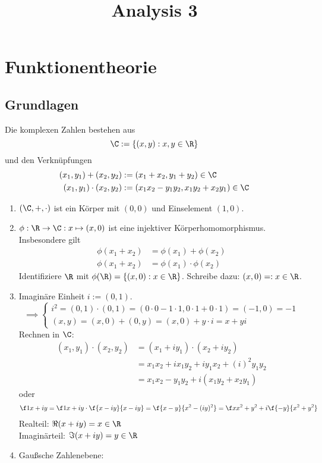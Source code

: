 \documentclass[a4paper,10pt]{scrartcl}
\title{Analysis 3}
\begin{document}
\maketitle

\tableofcontents
\newpage

\section{Funktionentheorie}

\subsection{Grundlagen}

\begin{df}
	\label{df:1.1}	
	Die komplexen Zahlen bestehen aus
	\[
		\C := \{(x,y) : x,y\in \R\}
	\]
	und den Verknüpfungen
	\begin{align*}
		(x_1,y_1) + (x_2,y_2) &:= (x_1 + x_2, y_1 + y_2) \in \C \\
		(x_1,y_1) \cdot (x_2,y_2) &:= (x_1x_2 - y_1y_2, x_1y_2 + x_2y_1) \in \C
	\end{align*}
\end{df}

\begin{nt}
	\label{nt:1.1}
	\begin{enumerate}
		\item $(\C,+,\cdot)$ ist ein Körper mit $(0,0)$ und Einselement $(1,0)$.
		\item 
			$\phi: \R\to \C : x\mapsto (x,0)$ ist eine injektiver Körperhomomorphismus.
			Insbesondere gilt
			\begin{align*}
				\phi(x_1+x_2) &= \phi(x_1) + \phi(x_2)\\
				\phi(x_1+x_2) &= \phi(x_1) \cdot \phi(x_2)
			\end{align*}
			Identifiziere $\R$ mit $\phi(\R) = \{(x,0) : x\in \R\}$.
			Schreibe dazu: $(x,0) =: x \in \R$.
		\item
			Imaginäre Einheit $i:= (0,1)$.
			\[
				\implies \begin{cases}
				i^2 = (0,1)\cdot (0,1) = (0\cdot 0 - 1\cdot 1, 0\cdot 1 + 0\cdot 1) = (-1,0) = -1 \\
				(x,y) = (x,0) + (0,y) = (x,0) + y\cdot i = x + yi
				\end{cases}
			\]
			Rechnen in $\C$:
			\begin{align*}
				(x_1,y_1)\cdot (x_2,y_2) &= (x_1 +iy_1)\cdot (x_2 + iy_2)\\
				&= x_1x_2 + ix_1y_2 + iy_1x_2 + (i)^2y_1y_2\\
				&= x_1x_2 - y_1y_2 + i(x_1y_2 + x_2y_1)
			\end{align*}
			oder
			\begin{align*}
				\f 1{x+iy} = \f 1{x+iy}\cdot \f {x-iy}{x-iy} = \f{x-y}{x^2-(iy)^2} = \f x{x^2+y^2} + i \f{-y}{x^2+y^2}
			\end{align*}
			Realteil: $\Re(x+iy) = x\in \R$ \\
			Imaginärteil: $\Im(x+iy) = y\in\R$
		\item
			Gaußsche Zahlenebene:
	\end{enumerate}
\end{nt}
\end{document}
